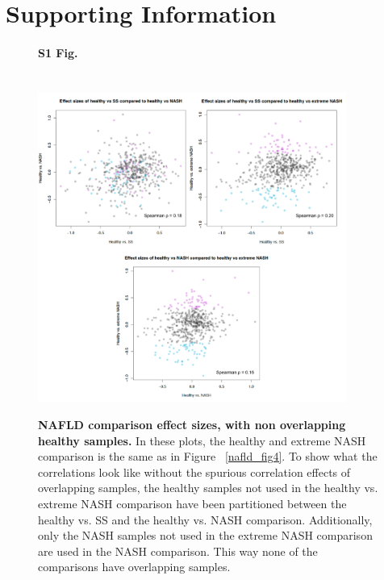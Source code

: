 \section*{{Supporting Information}}

\begin{figure}[h]
\paragraph*{S1 Fig.}{\mbox{}}\\
\includegraphics[width=0.9\textwidth]{nafld_16s_effect_sizes_partitioned_healthy.png}
\caption[NAFLD comparison effect sizes, with non overlapping healthy samples.]{{\bf {NAFLD comparison effect sizes, with non overlapping healthy samples.}} In these plots, the healthy and extreme NASH comparison is the same as in Figure ~\ref{nafld_fig4}. To show what the correlations look like without the spurious correlation effects of overlapping samples, the healthy samples not used in the healthy vs. extreme NASH comparison have been partitioned between the healthy vs. SS and the healthy vs. NASH comparison. Additionally, only the NASH samples not used in the extreme NASH comparison are used in the NASH comparison. This way none of the comparisons have overlapping samples.}
\label{nafld_non_overlapping_16s_effect}
\end{figure}


